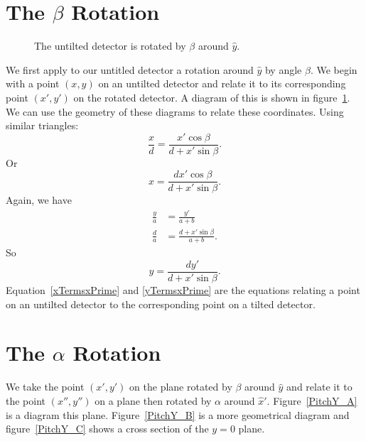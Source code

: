 \section{\texorpdfstring{The $\beta$ Rotation}{The beta Rotation}}

\begin{figure}[htb]
    \centering
    \subfloat[]{\label{PitchX_A}} 
    \hfill
    \subfloat[]{
    \label{PitchX_B}}
    \caption{The untilted detector is rotated by $\beta$ around
    $\hat y$.}
    \label{PitchX}
\end{figure}

We first apply to our untitled detector a rotation 
around $\hat{y}$ by angle $\beta$.
We begin with a point $(x,y)$ on an
untilted detector and relate it to its corresponding point 
$(x',y')$ on the rotated detector.
A diagram of this is shown in figure~\ref{PitchX}.  
We can use the geometry of these diagrams 
to relate these coordinates. Using
similar triangles:
\begin{equation}
    \frac{x}{d}=\frac{x'\cos\beta}{d+x'\sin\beta}.
\end{equation}
Or
\begin{equation}\label{xTermsxPrime}
    \boxed{x = \frac{dx'\cos\beta}{d+x'\sin\beta}}.
\end{equation}
Again, we have
\begin{align}
    \frac{y}{a}&=\frac{y'}{a+b}\\
    \frac{d}{a}&=\frac{d+x'\sin\beta}{a+b}.
\end{align}
So
\begin{equation}\label{yTermsxPrime}
	\boxed{y= \frac{dy'}{d+x'\sin\beta}}.
\end{equation}
Equation~\ref{xTermsxPrime} and \ref{yTermsxPrime} are 
the equations relating a point on an
untilted detector to the corresponding point 
on a tilted detector.

\section{\texorpdfstring{The $\alpha$ Rotation}{The alpha Rotation}}

We take the point $(x',y')$ on the plane rotated by $\beta$
around $\hat y$ and relate it to the point $(x'',y'')$ on a
plane then rotated by $\alpha$ around $\hat{x}'$. 
Figure~\ref{PitchY_A} is a diagram this plane.
Figure~\ref{PitchY_B} is a more geometrical diagram and
figure~\ref{PitchY_C} shows a cross section of the $y=0$
plane.

